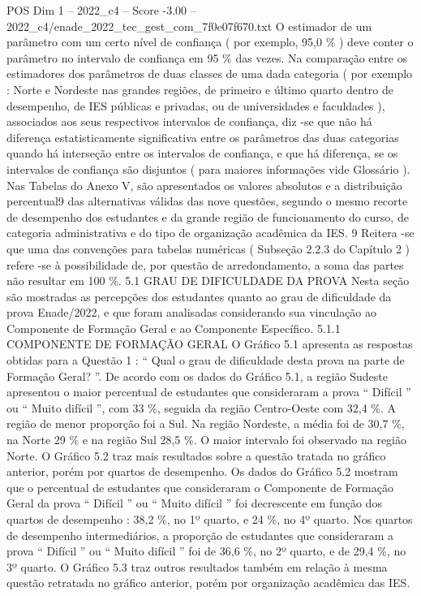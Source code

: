 \begin{textsample}{POS Dim 1 – 2022\_c4 – Score -3.00 – 2022\_c4/enade\_2022\_tec\_gest\_com\_7f0e07f670.txt}
O estimador de um parâmetro com um certo nível de confiança ( por exemplo, 95,0 \% ) deve conter o parâmetro no intervalo de confiança em 95 \% das vezes.
Na comparação entre os estimadores dos parâmetros de duas classes de uma dada categoria ( por exemplo : Norte e Nordeste nas grandes regiões, de primeiro e último quarto dentro de desempenho, de IES públicas e privadas, ou de universidades e faculdades ), associados aos seus respectivos intervalos de confiança, diz -se que não há diferença estatisticamente significativa entre os parâmetros das duas categorias quando há interseção entre os intervalos de confiança, e que há diferença, se os intervalos de confiança são disjuntos ( para maiores informações vide Glossário ).
Nas Tabelas do Anexo V, são apresentados os valores absolutos e a distribuição percentual9 das alternativas válidas das nove questões, segundo o mesmo recorte de desempenho dos estudantes e da grande região de funcionamento do curso, de categoria administrativa e do tipo de organização acadêmica da IES. 9 Reitera -se que uma das convenções para tabelas numéricas ( Subseção 2.2.3 do Capítulo 2 ) refere -se à possibilidade de, por questão de arredondamento, a soma das partes não resultar em 100 \%. 5.1 GRAU DE DIFICULDADE DA PROVA Nesta seção são mostradas as percepções dos estudantes quanto ao grau de dificuldade da prova Enade/2022, e que foram analisadas considerando sua vinculação ao Componente de Formação Geral e ao Componente Específico. 5.1.1 COMPONENTE DE FORMAÇÃO GERAL O Gráfico 5.1 apresenta as respostas obtidas para a Questão 1 : “ Qual o grau de dificuldade desta prova na parte de Formação Geral? ”.
De acordo com os dados do Gráfico 5.1, a região Sudeste apresentou o maior percentual de estudantes que consideraram a prova “ Difícil ” ou “ Muito difícil ”, com 33 \%, seguida da região Centro-Oeste com 32,4 \%.
A região de menor proporção foi a Sul.
Na região Nordeste, a média foi de 30,7 \%, na Norte 29 \% e na região Sul 28,5 \%.
O maior intervalo foi observado na região Norte.
O Gráfico 5.2 traz mais resultados sobre a questão tratada no gráfico anterior, porém por quartos de desempenho.
Os dados do Gráfico 5.2 mostram que o percentual de estudantes que consideraram o Componente de Formação Geral da prova “ Difícil ” ou “ Muito difícil ” foi decrescente em função dos quartos de desempenho : 38,2 \%, no 1º quarto, e 24 \%, no 4º quarto.
Nos quartos de desempenho intermediários, a proporção de estudantes que consideraram a prova “ Difícil ” ou “ Muito difícil ” foi de 36,6 \%, no 2º quarto, e de 29,4 \%, no 3º quarto.
O Gráfico 5.3 traz outros resultados também em relação à mesma questão retratada no gráfico anterior, porém por organização acadêmica das IES.

\end{textsample}
